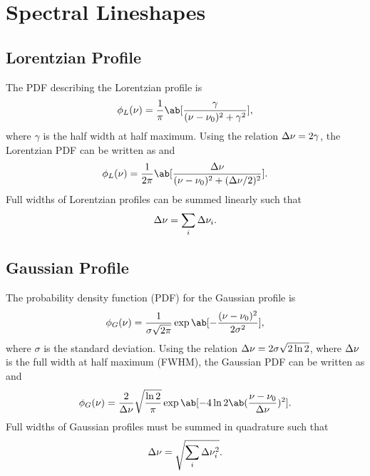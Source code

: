 \chapter{Spectral Lineshapes}
\label{c:spectral_lineshapes}

\section{Lorentzian Profile}
\label{s:lorentzian_profile}

The PDF describing the Lorentzian profile is
\begin{equation*}
    \phi_L(\nu) = \frac{1}{\pi}\ab[\frac{\gamma}{(\nu - \nu_0)^2 + \gamma^2}],
\end{equation*}
where $\gamma$ is the half width at half maximum.
Using the relation $\adif{\nu} = 2\gamma$, the Lorentzian PDF can be written as \cite[52]{foxStudentsGuideAtomic2018} and \cite[133]{hansonSpectroscopyOpticalDiagnostics2016}
\begin{equation*}
    \phi_L(\nu) = \frac{1}{2\pi}\ab[\frac{\adif{\nu}}{(\nu - \nu_0)^2 + (\adif{\nu}/2)^2}].
\end{equation*}
Full widths of Lorentzian profiles can be summed linearly such that \cite[361]{josyulaHypersonicNonequilibriumFlows2015}
\begin{equation*}
    \adif{\nu} = \sum_i \adif{\nu}_i.
\end{equation*}

\section{Gaussian Profile}
\label{s:gaussian_profile}

The probability density function (PDF) for the Gaussian profile is
\begin{equation*}
    \phi_G(\nu) = \frac{1}{\sigma\sqrt{2\pi}}\exp\ab[-\frac{(\nu - \nu_0)^2}{2\sigma^2}],
\end{equation*}
where $\sigma$ is the standard deviation.
Using the relation $\adif{\nu} = 2\sigma\sqrt{2\ln{2}}$, where $\adif{\nu}$ is the full width at half maximum (FWHM), the Gaussian PDF can be written as \cite[55]{foxStudentsGuideAtomic2018} and \cite[138]{hansonSpectroscopyOpticalDiagnostics2016}
\begin{equation*}
    \phi_G(\nu) = \frac{2}{\adif{\nu}}\sqrt{\frac{\ln{2}}{\pi}}\exp\ab[-4\ln{2}\ab(\frac{\nu - \nu_0}{\adif{\nu}})^2].
\end{equation*}
Full widths of Gaussian profiles must be summed in quadrature such that \cite[361]{josyulaHypersonicNonequilibriumFlows2015}
\begin{equation*}
    \adif{\nu} = \sqrt{\sum_i \adif{\nu}_i^2}.
\end{equation*}

